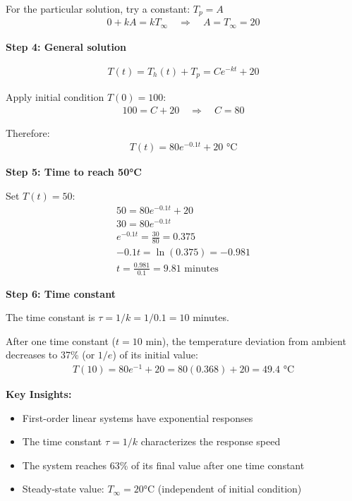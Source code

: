 \documentclass[11pt,a4paper]{article}
\begin{document}
For the particular solution, try a constant: $T_p = A$
\begin{align}
0 + kA = kT_{\infty} \quad \Rightarrow \quad A = T_{\infty} = 20
\end{align}

\textbf{Step 4: General solution}

\begin{align}
T(t) = T_h(t) + T_p = Ce^{-kt} + 20
\end{align}

Apply initial condition $T(0) = 100$:
\begin{align}
100 = C + 20 \quad \Rightarrow \quad C = 80
\end{align}

Therefore:
\begin{align}
T(t) = 80e^{-0.1t} + 20 \text{ °C}
\end{align}

\textbf{Step 5: Time to reach 50°C}

Set $T(t) = 50$:
\begin{align}
50 = 80e^{-0.1t} + 20 \\
30 = 80e^{-0.1t} \\
e^{-0.1t} = \frac{30}{80} = 0.375 \\
-0.1t = \ln(0.375) = -0.981 \\
t = \frac{0.981}{0.1} = 9.81 \text{ minutes}
\end{align}

\textbf{Step 6: Time constant}

The time constant is $\tau = 1/k = 1/0.1 = 10$ minutes.

After one time constant ($t = 10$ min), the temperature deviation from ambient decreases to 37\% (or $1/e$) of its initial value:
\begin{align}
T(10) = 80e^{-1} + 20 = 80(0.368) + 20 = 49.4 \text{ °C}
\end{align}

\textbf{Key Insights:}
\begin{itemize}
\item First-order linear systems have exponential responses
\item The time constant $\tau = 1/k$ characterizes the response speed
\item The system reaches 63\% of its final value after one time constant
\item Steady-state value: $T_{\infty} = 20$°C (independent of initial condition)
\end{itemize}
\end{document}
